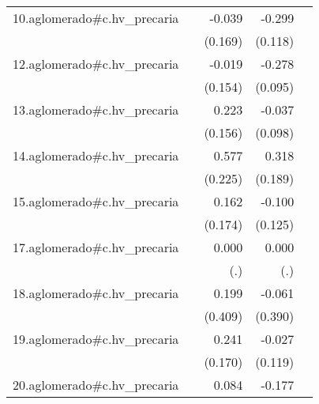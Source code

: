 {\begin{longtable}{l*{4}{D{.}{.}{-1}}}
\addlinespace
10.aglomerado#c.hv\_precaria&                     &      -0.039         &      -0.299\sym{*}  &                     \\
            &                     &     (0.169)         &     (0.118)         &                     \\
\addlinespace
12.aglomerado#c.hv\_precaria&                     &      -0.019         &      -0.278\sym{**} &                     \\
            &                     &     (0.154)         &     (0.095)         &                     \\
\addlinespace
13.aglomerado#c.hv\_precaria&                     &       0.223         &      -0.037         &                     \\
            &                     &     (0.156)         &     (0.098)         &                     \\
\addlinespace
14.aglomerado#c.hv\_precaria&                     &       0.577\sym{*}  &       0.318         &                     \\
            &                     &     (0.225)         &     (0.189)         &                     \\
\addlinespace
15.aglomerado#c.hv\_precaria&                     &       0.162         &      -0.100         &                     \\
            &                     &     (0.174)         &     (0.125)         &                     \\
\addlinespace
17.aglomerado#c.hv\_precaria&                     &       0.000         &       0.000         &                     \\
            &                     &         (.)         &         (.)         &                     \\
\addlinespace
18.aglomerado#c.hv\_precaria&                     &       0.199         &      -0.061         &                     \\
            &                     &     (0.409)         &     (0.390)         &                     \\
\addlinespace
19.aglomerado#c.hv\_precaria&                     &       0.241         &      -0.027         &                     \\
            &                     &     (0.170)         &     (0.119)         &                     \\
\addlinespace
20.aglomerado#c.hv\_precaria&                     &       0.084         &      -0.177         &                     \\

\end{longtable}}
